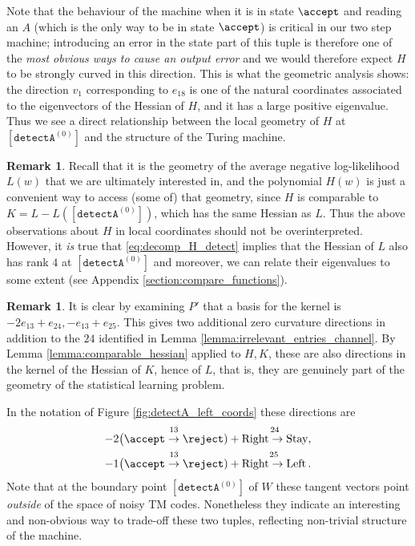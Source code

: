 \documentclass[english,letter paper,12pt,reqno]{article}
\theoremstyle{definition}
\newtheorem{remark}[theorem]{Remark}
\newcommand{\detectA}{\texttt{detectA}}
\begin{document}
Note that the behaviour of the machine when it is in state $\accept$ and reading an $A$ (which is the only way to be in state $\accept$) is critical in our two step machine; introducing an error in the state part of this tuple is therefore one of the \emph{most obvious ways to cause an output error} and we would therefore expect $H$ to be strongly curved in this direction. This is what the geometric analysis shows: the direction $v_1$ corresponding to $e_{18}$ is one of the natural coordinates associated to the eigenvectors of the Hessian of $H$, and it has a large positive eigenvalue. Thus we see a direct relationship between the local geometry of $H$ at $[\detectA^{(0)}]$ and the structure of the Turing machine.




\begin{remark} Recall that it is the geometry of the average negative log-likelihood $L(w)$ that we are ultimately interested in, and the polynomial $H(w)$ is just a convenient way to access (some of) that geometry, since $H$ is comparable to $K = L-L([\detectA^{(0)}])$, which has the same Hessian as $L$. Thus the above observations about $H$ in local coordinates should not be overinterpreted. However, it \emph{is} true that \eqref{eq:decomp_H_detect} implies that the Hessian of $L$ also has rank $4$ at $[\detectA^{(0)}]$ and moreover, we can relate their eigenvalues to some extent (see Appendix \ref{section:compare_functions}).
\end{remark}

\begin{remark}\label{remark:kernel_hessian_example} It is clear by examining $P'$ that a basis for the kernel is $-2e_{13} + e_{24}, -e_{13} + e_{25}$. This gives two additional zero curvature directions in addition to the $24$ identified in Lemma \ref{lemma:irrelevant_entries_channel}. By Lemma \ref{lemma:comparable_hessian} applied to $H,K$, these are also directions in the kernel of the Hessian of $K$, hence of $L$, that is, they are genuinely part of the geometry of the statistical learning problem.

In the notation of Figure \ref{fig:detectA_left_coords} these directions are
\begin{gather*}
-2\big( \overset{13}{\accept \rightarrow \reject} ) + \overset{24}{\text{Right} \rightarrow \text{Stay}},\\
-1 \big( \overset{13}{\accept \rightarrow \reject} ) + \overset{25}{\text{Right} \rightarrow \text{Left}}\,.
\end{gather*}
Note that at the boundary point $[\detectA^{(0)}]$ of $W$ these tangent vectors point \emph{outside} of the space of noisy TM codes. Nonetheless they indicate an interesting and non-obvious way to trade-off these two tuples, reflecting non-trivial structure of the machine.
\end{remark}
\end{document}
